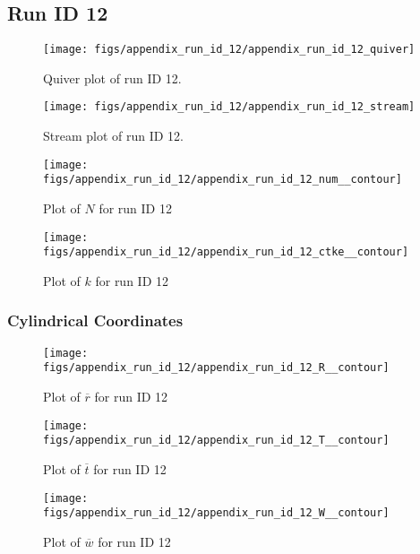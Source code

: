 \subsection{Run ID 12}
\begin{figure}[H]
\centering
\texttt{[image: figs/appendix\_run\_id\_12/appendix\_run\_id\_12\_quiver]}
\caption{Quiver plot of run ID 12.}
\label{fig:appendix_run_id_12_quiver}
\end{figure}


\begin{figure}[H]
\centering
\texttt{[image: figs/appendix\_run\_id\_12/appendix\_run\_id\_12\_stream]}
\caption{Stream plot of run ID 12.}
\label{fig:appendix_run_id_12_stream}
\end{figure}


\begin{figure}[H]
\centering
\texttt{[image: figs/appendix\_run\_id\_12/appendix\_run\_id\_12\_num\_\_contour]}
\caption{Plot of $N$ for run ID 12}
\label{fig:appendix_run_id_12_num__contour}
\end{figure}


\begin{figure}[H]
\centering
\texttt{[image: figs/appendix\_run\_id\_12/appendix\_run\_id\_12\_ctke\_\_contour]}
\caption{Plot of $k$ for run ID 12}
\label{fig:appendix_run_id_12_ctke__contour}
\end{figure}


\subsubsection{Cylindrical Coordinates}
\begin{figure}[H]
\centering
\texttt{[image: figs/appendix\_run\_id\_12/appendix\_run\_id\_12\_R\_\_contour]}
\caption{Plot of $\overline{r}$ for run ID 12}
\label{fig:appendix_run_id_12_R__contour}
\end{figure}


\begin{figure}[H]
\centering
\texttt{[image: figs/appendix\_run\_id\_12/appendix\_run\_id\_12\_T\_\_contour]}
\caption{Plot of $\overline{t}$ for run ID 12}
\label{fig:appendix_run_id_12_T__contour}
\end{figure}


\begin{figure}[H]
\centering
\texttt{[image: figs/appendix\_run\_id\_12/appendix\_run\_id\_12\_W\_\_contour]}
\caption{Plot of $\overline{w}$ for run ID 12}
\label{fig:appendix_run_id_12_W__contour}
\end{figure}


